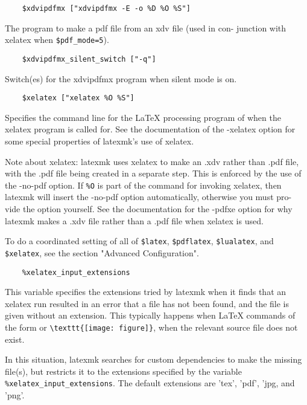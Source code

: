 \begin{verbatim}
	$xdvipdfmx ["xdvipdfmx -E -o %D %O %S"]
\end{verbatim}

The  program  to  make a pdf file from an xdv file (used in con-
junction with xelatex when \verb|$pdf_mode=5|).

\begin{verbatim}
	$xdvipdfmx_silent_switch ["-q"]
\end{verbatim}

Switch(es) for the xdvipdfmx program when silent mode is on.

\begin{verbatim}
	$xelatex ["xelatex %O %S"]
\end{verbatim}

Specifies the command line for the LaTeX processing  program  of
when  the  xelatex program is called for.  See the documentation
of the -xelatex option for some special properties of  latexmk's
use of xelatex.

Note  about xelatex: latexmk uses xelatex to make an .xdv rather
than .pdf file, with the .pdf file being created in  a  separate
step.  This is enforced by the use of the -no-pdf option.  If \verb|%O|
is part of the command for invoking xelatex, then  latexmk  will
insert the -no-pdf option automatically, otherwise you must pro-
vide the option yourself.  See the documentation for the  -pdfxe
option for why latexmk makes a .xdv file rather than a .pdf file
when xelatex is used.

To do a coordinated setting of all of \verb|$latex|, \verb|$pdflatex|, \verb|$lualatex|, 
and \verb|$xelatex|, see the section "Advanced Configuration".

\begin{verbatim}
	%xelatex_input_extensions
\end{verbatim}

This  variable specifies the extensions tried by latexmk when it
finds that an xelatex run resulted in an error that a  file  has
not  been  found,  and  the  file is given without an extension.
This typically happens when LaTeX  commands  of  the  form  \verb||  or \verb|\texttt{[image: figure]}|, when the relevant source
file does not exist.

In this situation, latexmk searches for custom  dependencies  to
make  the  missing  file(s),  but restricts it to the extensions specified by
the variable  \verb|%xelatex_input_extensions|.   The  default extensions are
'tex', 'pdf', 'jpg, and 'png'.

